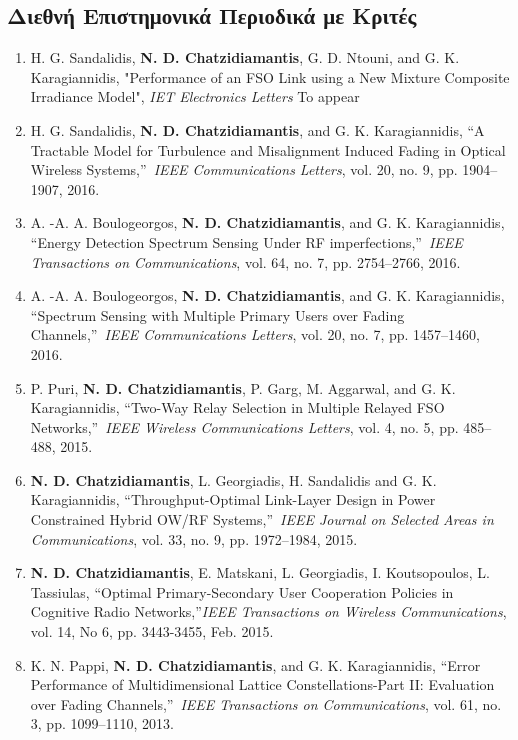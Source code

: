 \documentclass[11pt]{article}
\begin{document}
\greektext
\subsection{Διεθνή Επιστημονικά Περιοδικά με Κριτές}
\renewcommand{\labelenumi}{[J\arabic{enumi}]}
\begin{enumerate}\latintext
\item H. G. Sandalidis, \textbf{N. D. Chatzidiamantis}, G. D. Ntouni, and G. K. Karagiannidis, "Performance of an FSO Link using a New Mixture Composite Irradiance Model", \emph{IET Electronics Letters} To appear

\item H. G. Sandalidis, \textbf{N. D. Chatzidiamantis},
and G. K. Karagiannidis, \textquotedblleft A Tractable Model for Turbulence and Misalignment Induced Fading in Optical Wireless Systems,\textquotedblright\ \emph{IEEE Communications Letters}, vol. 20, no. 9, pp. 1904--1907, 2016.
\item	A. -A. A. Boulogeorgos, \textbf{N. D. Chatzidiamantis}, and G. K. Karagiannidis, \textquotedblleft Energy Detection Spectrum Sensing Under RF imperfections,\textquotedblright\ \emph{IEEE Transactions on Communications}, vol. 64, no. 7, pp. 2754--2766, 2016.
\item A. -A. A. Boulogeorgos, \textbf{N. D. Chatzidiamantis}, and G. K. Karagiannidis, \textquotedblleft Spectrum Sensing with Multiple Primary Users over Fading Channels,\textquotedblright\ \emph{IEEE Communications Letters}, vol. 20, no. 7, pp. 1457--1460, 2016.
\item	P. Puri, \textbf{N. D. Chatzidiamantis}, P. Garg, M. Aggarwal, and G. K. Karagiannidis, \textquotedblleft Two-Way Relay Selection in Multiple Relayed FSO Networks,\textquotedblright\ \emph{IEEE Wireless Communications Letters}, vol. 4, no. 5, pp. 485--488, 2015.

\item	\textbf{N. D. Chatzidiamantis}, L. Georgiadis, H. Sandalidis and G. K. Karagiannidis, \textquotedblleft Throughput-Optimal Link-Layer Design in Power Constrained Hybrid OW/RF Systems,\textquotedblright\ \emph{IEEE Journal on Selected Areas in Communications}, vol. 33, no. 9, pp. 1972--1984, 2015.
\item	\textbf{N. D. Chatzidiamantis}, E. Matskani, L. Georgiadis, I. Koutsopoulos, L. Tassiulas, \textquotedblleft Optimal Primary-Secondary User Cooperation Policies in Cognitive Radio Networks,\textquotedblright \emph{IEEE Transactions on Wireless Communications}, vol. 14, No 6, pp. 3443-3455, Feb. 2015.
\item K. N. Pappi, \textbf{N. D. Chatzidiamantis}, and G. K. Karagiannidis, \textquotedblleft Error
Performance of Multidimensional Lattice Constellations-Part II: Evaluation over Fading
Channels,\textquotedblright\ \emph{IEEE Transactions on Communications}, vol. 61, no. 3, pp. 1099--1110, 2013.


\end{enumerate}
\end{document}
